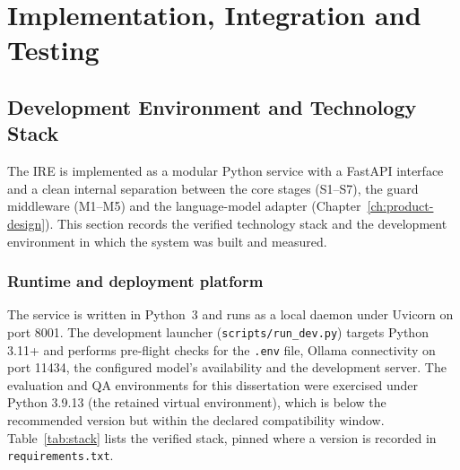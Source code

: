 \chapter{Implementation, Integration and Testing}\label{ch:implementation-testing}

\section{Development Environment and Technology Stack}\label{sec:dev-environment}

The IRE is implemented as a modular Python service with a FastAPI interface
and a clean internal separation between the core stages (S1--S7), the guard
middleware (M1--M5) and the language-model adapter (Chapter~\ref{ch:product-design}).
This section records the verified technology stack and the development
environment in which the system was built and measured.

\subsection*{Runtime and deployment platform}

The service is written in Python~3 and runs as a local daemon under Uvicorn on
port 8001. The development launcher (\texttt{scripts/run\_dev.py}) targets
Python 3.11+ and performs pre-flight checks for the \texttt{.env} file, Ollama
connectivity on port 11434, the configured model's availability and the
development server. The evaluation and QA environments for this dissertation
were exercised under Python 3.9.13 (the retained virtual environment), which
is below the recommended version but within the declared compatibility window.
Table~\ref{tab:stack} lists the verified stack, pinned where a version is
recorded in \texttt{requirements.txt}.

